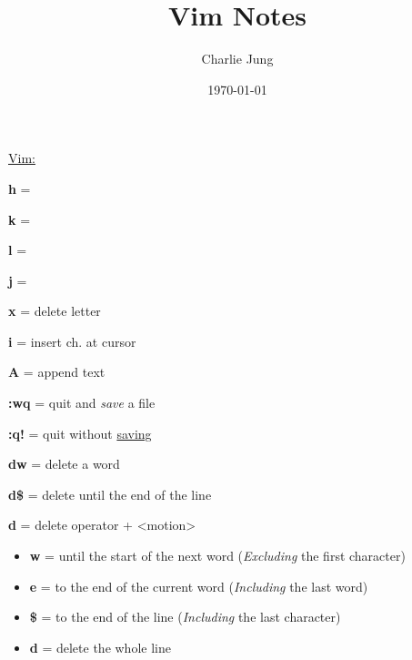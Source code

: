 \documentclass[12pt, letterpaper]{article}
\title {\textbf{Vim} Notes}
\author{Charlie Jung}
\date{\today}
\begin{document}
\maketitle

\newpage
\underline{Vim:} 
\\


\begin{flushleft}



\textbf{h} = \leftarrow 
\par

\textbf{k} = \uparrow 
\par

\textbf{l} = \rightarrow 
\par

\textbf{j} = \downarrow 
\par

\textbf{x} = delete letter \\
\par 
\textbf{i} = insert ch. at cursor  \\
\par
\textbf{A} = append text \\
\par
\textbf{:wq} = quit and \textit{save} a file \\
\par
\textbf{:q!} = quit without \underline{saving} \\
\par
\textbf{dw} = delete a word \\
\par
\textbf{d\$} = delete until the end of the line \\
\par
\textbf{d} = delete operator + <motion> 

\begin{itemize}[leftmargin = 10ex]
    \item \textbf{w} = until the start of the next word (\textit{Excluding} the first character) 
    \item \textbf{e} = to the end of the current word (\textit{Including} the last word) \par
    \item \textbf{\$} = to the end of the line (\textit{Including} the last character)  \par 
    \item \textbf{d} = delete the whole line \par 
\end{itemize}



\end{flushleft}
\end{document}
